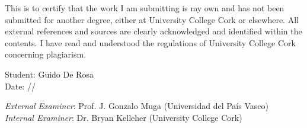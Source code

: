 This is to certify that the work I am submitting is my own and has not been
submitted for another degree, either at University College Cork or elsewhere. All
external references and sources are clearly acknowledged and identified within the
contents. I have read and understood the regulations of University College Cork
concerning plagiarism.

\hfill

\noindent Student: Guido De Rosa \\
\noindent Date: {\number\day}/{\number\month}/{\number\year}

\hfill

\hfill

\noindent \emph{External Examiner}: Prof. J. Gonzalo Muga (Universidad del Pa\'{i}s Vasco)\\
\noindent \emph{Internal Examiner}: Dr. Bryan Kelleher (University College Cork)
